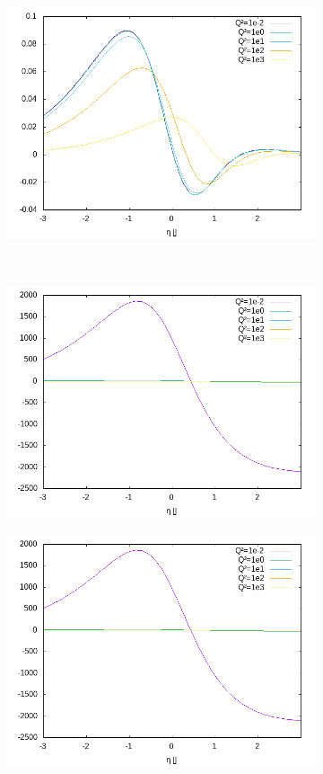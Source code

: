 \begin{figure}[ht!]
\begin{subfigure}[t]{.3\textwidth}
	\includegraphics[width=\textwidth]{../../img2/partonic/cgBar1_VV_x2g1}
\end{subfigure}\\%
\begin{subfigure}[t]{.3\textwidth}
	\includegraphics[width=\textwidth]{../../img2/partonic/cgBar1_AA_F2}
\end{subfigure}%
\begin{subfigure}[t]{.3\textwidth}
	\includegraphics[width=\textwidth]{../../img2/partonic/cgBar1_AA_FL}

\end{subfigure}
\end{figure}
